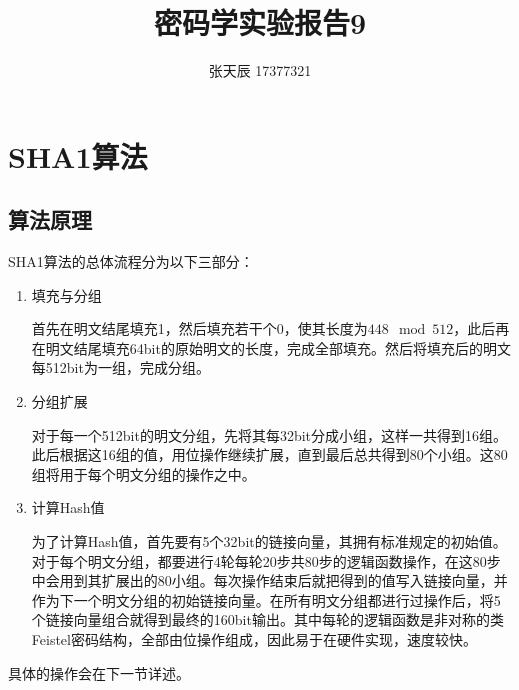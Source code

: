 \documentclass[11pt]{ctexart}
\title{密码学实验报告9}
\author{张天辰 17377321}
\begin{document}
\maketitle{}
\section{SHA1算法} %
\subsection{算法原理} %
SHA1算法的总体流程分为以下三部分：
\begin{enumerate}[1]
    \item 填充与分组

    首先在明文结尾填充1，然后填充若干个0，使其长度为$448 \mod 512$，此后再在明文结尾填充64bit的原始明文的长度，完成全部填充。然后将填充后的明文每512bit为一组，完成分组。
    \item 分组扩展

    对于每一个512bit的明文分组，先将其每32bit分成小组，这样一共得到16组。此后根据这16组的值，用位操作继续扩展，直到最后总共得到80个小组。这80组将用于每个明文分组的操作之中。
    \item 计算Hash值

    为了计算Hash值，首先要有5个32bit的链接向量，其拥有标准规定的初始值。对于每个明文分组，都要进行4轮每轮20步共80步的逻辑函数操作，在这80步中会用到其扩展出的80小组。每次操作结束后就把得到的值写入链接向量，并作为下一个明文分组的初始链接向量。在所有明文分组都进行过操作后，将5个链接向量组合就得到最终的160bit输出。其中每轮的逻辑函数是非对称的类Feistel密码结构，全部由位操作组成，因此易于在硬件实现，速度较快。
\end{enumerate}
具体的操作会在下一节详述。
\end{document}
